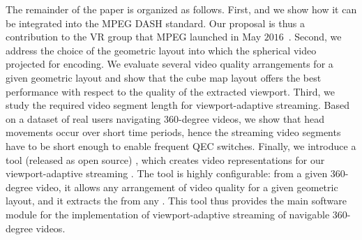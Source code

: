 The remainder of the paper is organized as follows. First,  and 
we show how it can be integrated into
the \ac{MPEG} \ac{DASH} standard. Our proposal is thus a contribution
to the \ac{VR} group that \ac{MPEG} launched in May
$2016$~\cite{mpeg-vr}. Second, we address the choice of the geometric
layout into which the spherical video  projected for
encoding. We evaluate several video quality arrangements for a given
geometric layout and show that the cube map layout offers the best
performance with respect to the quality of the extracted viewport.
Third, we study the required video segment length for
viewport-adaptive streaming. Based on a dataset of real users
navigating 360-degree videos, we show that head movements occur over
short time periods, hence the streaming video segments have to be
short enough to enable frequent \ac{QEC} switches. 
Finally, we introduce a tool (released as open source)%
, which creates video representations for our viewport-adaptive streaming .
The tool is highly configurable: from a given
360-degree video, it allows any arrangement of video quality for a
given geometric layout, and it extracts the  from any .
This tool thus provides the main software module
for the implementation of viewport-adaptive streaming of navigable
360-degree videos.	


